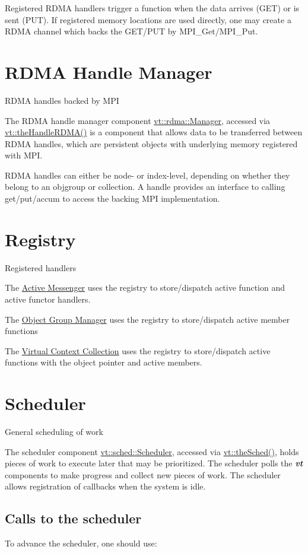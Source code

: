 Registered R\+D\+MA handlers trigger a function when the data arrives (G\+ET) or is sent (P\+UT). If registered memory locations are used directly, one may create a R\+D\+MA channel which backs the G\+E\+T/\+P\+UT by {\ttfamily M\+P\+I\+\_\+\+Get}/{\ttfamily M\+P\+I\+\_\+\+Put}. \hypertarget{rdmahandle}{}\section{R\+D\+MA Handle Manager}\label{rdmahandle}
R\+D\+MA handles backed by M\+PI

The R\+D\+MA handle manager component {\ttfamily \hyperlink{structvt_1_1rdma_1_1_manager}{vt\+::rdma\+::\+Manager}}, accessed via {\ttfamily \hyperlink{namespacevt_aecb87ec2c40b5b7fc57ba4cf8ea838b0}{vt\+::the\+Handle\+R\+D\+M\+A()}} is a component that allows data to be transferred between R\+D\+MA handles, which are persistent objects with underlying memory registered with M\+PI.

R\+D\+MA handles can either be node-\/ or index-\/level, depending on whether they belong to an objgroup or collection. A handle provides an interface to calling get/put/accum to access the backing M\+PI implementation. \hypertarget{registry}{}\section{Registry}\label{registry}
Registered handlers


\begin{DoxyItemize}
\item The \hyperlink{active-messenger}{Active Messenger} uses the registry to store/dispatch active function and active functor handlers.
\item The \hyperlink{objgroup}{Object Group Manager} uses the registry to store/dispatch active member functions
\item The \hyperlink{collection}{Virtual Context Collection} uses the registry to store/dispatch active functions with the object pointer and active members. 
\end{DoxyItemize}\hypertarget{scheduler}{}\section{Scheduler}\label{scheduler}
General scheduling of work

The scheduler component {\ttfamily \hyperlink{structvt_1_1sched_1_1_scheduler}{vt\+::sched\+::\+Scheduler}}, accessed via {\ttfamily \hyperlink{namespacevt_a4508b38e6ab664b64f1415aecbb83571}{vt\+::the\+Sched()}}, holds pieces of work to execute later that may be prioritized. The scheduler polls the {\bfseries {\itshape vt}} components to make progress and collect new pieces of work. The scheduler allows registration of callbacks when the system is idle.\hypertarget{scheduler_calls-to-the-scheduler}{}\subsection{Calls to the scheduler}\label{scheduler_calls-to-the-scheduler}
To advance the scheduler, one should use\+:


